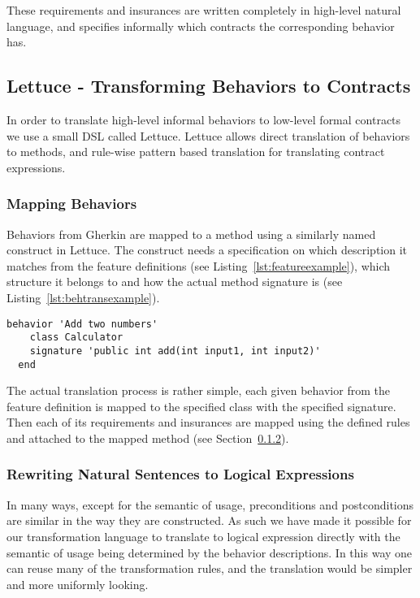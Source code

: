 These requirements and insurances are written completely in high-level
natural language, and specifies informally which contracts the corresponding
behavior has.

\subsection{Lettuce - Transforming Behaviors to Contracts}
\label{sub:Lettuce - Transforming Behaviors to Contracts}

In order to translate high-level informal behaviors to low-level formal
contracts we use a small DSL called Lettuce.
Lettuce allows direct translation of behaviors to methods,
and rule-wise pattern based translation for translating contract expressions.

\subsubsection{Mapping Behaviors}
\label{sub:Mapping Behaviors}

Behaviors from Gherkin are mapped to a method using a similarly named
construct in Lettuce. The construct needs a specification on which
description it matches from the feature definitions (see Listing~\ref{lst:featureexample}),
which structure it belongs to and how the actual method signature is
(see Listing~\ref{lst:behtransexample}).

\begin{lstlisting}[caption={General Behavior Description of Adding Natural Numbers},label={lst:behtransexample}]
  behavior 'Add two numbers'
    class Calculator
    signature 'public int add(int input1, int input2)'
  end
\end{lstlisting}

The actual translation process is rather simple,
each given behavior from the feature definition is mapped to the
specified class with the specified signature. Then each of its requirements
and insurances are mapped using the defined rules and attached to the mapped
method (see Section~\ref{sub:Rewriting Natural Sentences to Logical Expressions}).

\subsubsection{Rewriting Natural Sentences to Logical Expressions}
\label{sub:Rewriting Natural Sentences to Logical Expressions}

In many ways, except for the semantic of usage,
preconditions and postconditions are similar in the way they are constructed.
As such we have made it possible for our transformation language to translate
to logical expression directly with the semantic of usage being determined by
the behavior descriptions. In this way one can reuse many of the
transformation rules, and the translation would be simpler
and more uniformly looking.

